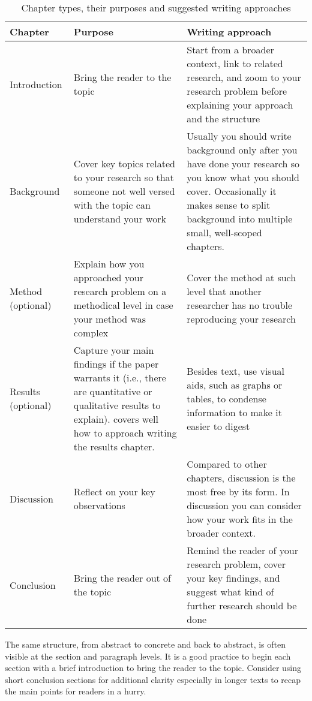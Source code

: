 \begin{table}
    \begin{tabular}{l|p{4.0cm}|p{5.0cm}}
        Chapter & Purpose & Writing approach \\
        \hline
        Introduction & Bring the reader to the topic & Start from a broader context, link to related research, and zoom to your research problem before explaining your approach and the structure \\
        Background & Cover key topics related to your research so that someone not well versed with the topic can understand your work & Usually you should write background only after you have done your research so you know what you should cover. Occasionally it makes sense to split background into multiple small, well-scoped chapters. \\
        Method (optional) & Explain how you approached your research problem on a methodical level in case your method was complex & Cover the method at such level that another researcher has no trouble reproducing your research \\
        Results (optional) & Capture your main findings if the paper warrants it (i.e., there are quantitative or qualitative results to explain). \citet{ecarnot2015writing} covers well how to approach writing the results chapter. & Besides text, use visual aids, such as graphs or tables, to condense information to make it easier to digest \\
        Discussion & Reflect on your key observations & Compared to other chapters, discussion is the most free by its form. In discussion you can consider how your work fits in the broader context. \\
        Conclusion & Bring the reader out of the topic & Remind the reader of your research problem, cover your key findings, and suggest what kind of further research should be done \\
    \end{tabular}
    \caption{Chapter types, their purposes and suggested writing approaches}
    \label{table:imrad}
\end{table}

The same structure, from abstract to concrete and back to abstract, is often visible at the section and paragraph levels.
It is a good practice to begin each section with a brief introduction to bring the reader to the topic.
Consider using short conclusion sections for additional clarity especially in longer texts to recap the main points for readers in a hurry.

